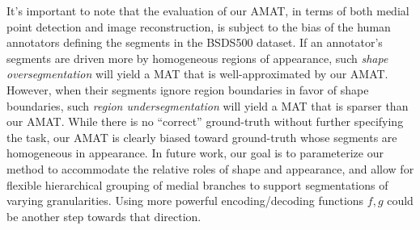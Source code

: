 \documentclass[10pt,twocolumn,letterpaper]{article}
\begin{document}
It's important to note that the evaluation of our AMAT, in terms of both medial point detection and image reconstruction, 
is subject to the bias of the human annotators defining the segments in the BSDS500 dataset.  
If an annotator's segments are driven more by homogeneous regions of appearance, such \emph{shape oversegmentation}
will yield a MAT that is well-approximated by our AMAT. 
However, when their segments ignore region boundaries in favor of shape boundaries, such \emph{region undersegmentation}
will yield a MAT that is sparser than our AMAT.
While there is no ``correct'' ground-truth without further specifying the task, 
our AMAT is clearly biased toward ground-truth whose segments are homogeneous in appearance.
In future work, our goal is to parameterize our method to accommodate the relative roles of shape and appearance,
and allow for flexible hierarchical grouping of medial branches to support segmentations of varying granularities.
Using more powerful encoding/decoding functions $f,g$ could be another step towards that direction.



{\small


}
\end{document}
